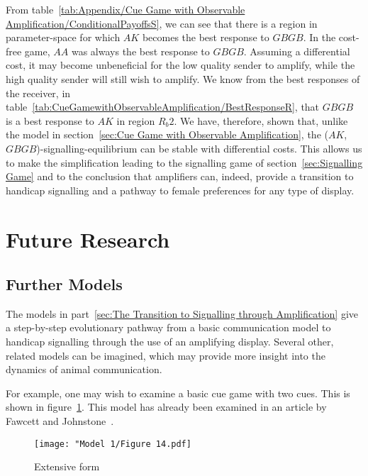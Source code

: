 \documentclass[a4paper,12pt]{article}
\numberwithin{equation}{section}
\begin{document}
From table~\ref{tab:Appendix/Cue Game with Observable Amplification/ConditionalPayoffsS}, we can see that there is a region in parameter-space for which $AK$ becomes the best response to $GBGB$. In the cost-free game, $AA$ was always the best response to $GBGB$. Assuming a differential cost, it may become unbeneficial for the low quality sender to amplify, while the high quality sender will still wish to amplify. We know from the best responses of the receiver, in table~\ref{tab:CueGamewithObservableAmplification/BestResponseR}, that $GBGB$ is a best response to $AK$ in region $R_{b}2$. We have, therefore, shown that, unlike the model in section~\ref{sec:Cue Game with Observable Amplification}, the ($AK$,~$GBGB$)-signalling-equilibrium can be stable with differential costs. This allows us to make the simplification leading to the signalling game of section~\ref{sec:Signalling Game} and to the conclusion that amplifiers can, indeed, provide a transition to handicap signalling and a pathway to female preferences for any type of display.

\newpage \clearpage


\section{Future Research}
\label{sec:Future Research}
\subsection{Further Models}
\label{sec:Appendix/Further Models}

The models in part~\ref{sec:The Transition to Signalling through Amplification} give a step-by-step evolutionary pathway from a basic communication model to handicap signalling through the use of an amplifying display. Several other, related models can be imagined, which may provide more insight into the dynamics of animal communication.

For example, one may wish to examine a basic cue game with two cues. This is shown in figure~\ref{fig:Model 1/Figure 14.pdf}. This model has already been examined in an article by Fawcett and Johnstone~\cite{Fawcett2003}.
\begin{figure}[h]
\begin{center}
\leavevmode
\texttt{[image: "Model 1/Figure 14.pdf]}
\caption{Extensive form}
\label{fig:Model 1/Figure 14.pdf}
\end{center}
\end{figure}
\end{document}
